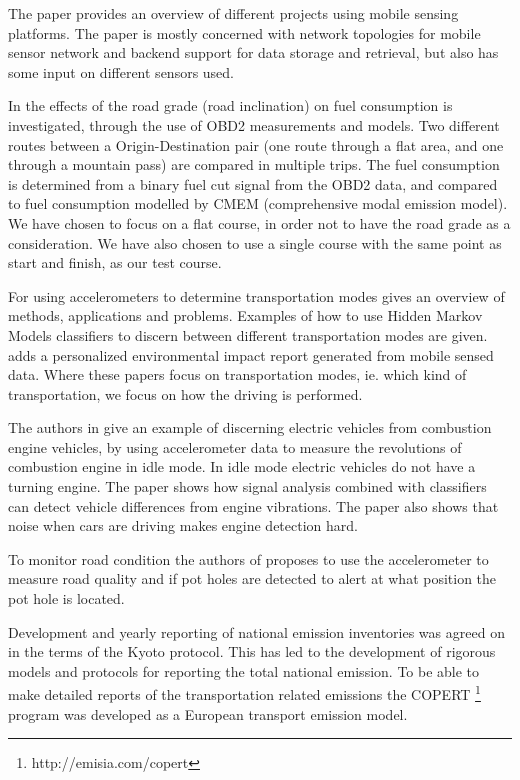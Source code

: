 The paper \cite{Lee2010} provides an overview of different projects using mobile sensing platforms. The paper is mostly concerned with network topologies for mobile sensor network and backend support for data storage and retrieval, but also has some input on different sensors used.

In \cite{Boriboon} the effects of the road grade (road inclination) on fuel consumption is investigated, through the use of OBD2 measurements and models. Two different routes between a Origin-Destination pair (one route through a flat area, and one through a mountain pass) are compared in multiple trips. The fuel consumption is determined from a binary fuel cut signal from the OBD2 data, and compared to fuel consumption modelled by CMEM (comprehensive modal emission model). We have chosen to focus on a flat course, in order not to have the road grade as a consideration. We have also chosen to use a single course with the same point as start and finish, as our test course.

For using accelerometers to determine transportation modes \cite{Hemminki2013} gives an overview of methods, applications and problems. Examples of how to use Hidden Markov Models classifiers to discern between different transportation modes are given. \cite{mun_peir_2009} adds a personalized environmental impact report generated from mobile sensed data. Where these papers focus on transportation modes, ie. which kind of transportation, we focus on how the driving is performed.

The authors in \cite{markus2014} give an example of discerning electric vehicles from combustion engine vehicles, by using accelerometer data to measure the revolutions of combustion engine in idle mode. In idle mode electric vehicles do not have a turning engine. The paper shows how signal analysis combined with classifiers can detect vehicle differences from engine vibrations. The paper also shows that noise when cars are driving makes engine detection hard.

To monitor road condition the authors of \cite{ghose2012road} proposes to use the accelerometer to measure road quality and if pot holes are detected to alert at what position the pot hole is located.

Development and yearly reporting of national emission inventories was agreed on in the terms of the Kyoto protocol. This has led to the development of rigorous models and protocols for reporting the total national emission. To be able to make detailed reports of the transportation related emissions the COPERT \footnote{http://emisia.com/copert} \cite{Mellios2011} program was developed as a European transport emission model.

